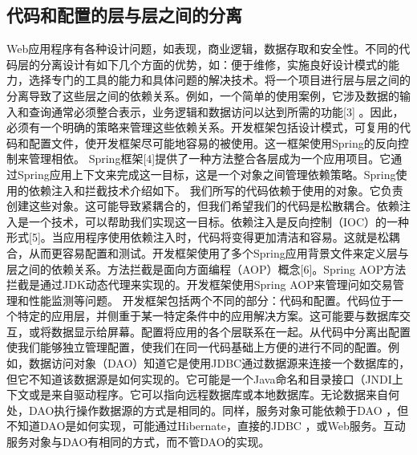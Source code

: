 \subsection{代码和配置的层与层之间的分离}
Web应用程序有各种设计问题，如表现，商业逻辑，数据存取和安全性。不同的代码层的分离设计有如下几个方面的优势，如：便于维修，实施良好设计模式的能力，选择专门的工具的能力和具体问题的解决技术。将一个项目进行层与层之间的分离导致了这些层之间的依赖关系。例如，一个简单的使用案例，它涉及数据的输入和查询通常必须整合表示，业务逻辑和数据访问以达到所需的功能[3] 。因此，必须有一个明确的策略来管理这些依赖关系。开发框架包括设计模式，可复用的代码和配置文件，使开发框架尽可能地容易的被使用。这一框架使用Spring的反向控制来管理相依。 Spring框架[4]提供了一种方法整合各层成为一个应用项目。它通过Spring应用上下文来完成这一目标，这是一个对象之间管理依赖策略。Spring使用的依赖注入和拦截技术介绍如下。
我们所写的代码依赖于使用的对象。它负责创建这些对象。这可能导致紧耦合的，但我们希望我们的代码是松散耦合。依赖注入是一个技术，可以帮助我们实现这一目标。依赖注入是反向控制（IOC）的一种形式[5]。当应用程序使用依赖注入时，代码将变得更加清洁和容易。这就是松耦合，从而更容易配置和测试。开发框架使用了多个Spring应用背景文件来定义层与层之间的依赖关系。方法拦截是面向方面编程（AOP）概念[6]。Spring AOP方法拦截是通过JDK动态代理来实现的。开发框架使用Spring AOP来管理问如交易管理和性能监测等问题。
开发框架包括两个不同的部分：代码和配置。代码位于一个特定的应用层，并侧重于某一特定条件中的应用解决方案。这可能要与数据库交互，或将数据显示给屏幕。配置将应用的各个层联系在一起。从代码中分离出配置使我们能够独立管理配置，使我们在同一代码基础上方便的进行不同的配置。例如，数据访问对象（DAO）知道它是使用JDBC通过数据源来连接一个数据库的，但它不知道该数据源是如何实现的。它可能是一个Java命名和目录接口（JNDI上下文或是来自驱动程序。它可以指向远程数据库或本地数据库。无论数据来自何处，DAO执行操作数据源的方式是相同的。同样，服务对象可能依赖于DAO ，但不知道DAO是如何实现，可能通过Hibernate，直接的JDBC ，或Web服务。互动服务对象与DAO有相同的方式，而不管DAO的实现。
